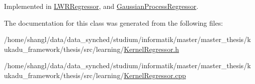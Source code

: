 \-Implemented in \hyperlink{classLWRRegressor_aea55827ce2c63078414469fe21c16f23}{\-L\-W\-R\-Regressor}, and \hyperlink{classGaussianProcessRegressor_a9c4ad88ae6cbbc457cbfa17c64e59d1b}{\-Gaussian\-Process\-Regressor}.



\-The documentation for this class was generated from the following files\-:\begin{DoxyCompactItemize}
\item 
/home/shangl/data/data\-\_\-synched/studium/informatik/master/master\-\_\-thesis/kukadu\-\_\-framework/thesis/src/learning/\hyperlink{KernelRegressor_8h}{\-Kernel\-Regressor.\-h}\item 
/home/shangl/data/data\-\_\-synched/studium/informatik/master/master\-\_\-thesis/kukadu\-\_\-framework/thesis/src/learning/\hyperlink{KernelRegressor_8cpp}{\-Kernel\-Regressor.\-cpp}\end{DoxyCompactItemize}
